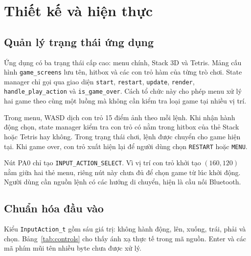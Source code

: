 \chapter{Thiết kế và hiện thực}
\label{chap:implementation}

\section{Quản lý trạng thái ứng dụng}

Ứng dụng có ba trạng thái cấp cao: menu chính, Stack 3D và Tetris. Mảng cấu hình \texttt{game\_screens} lưu tên, hitbox và các con trỏ hàm của từng trò chơi. State manager chỉ gọi qua giao diện \texttt{start}, \texttt{restart}, \texttt{update}, \texttt{render}, \texttt{handle\_play\_action} và \texttt{is\_game\_over}. Cách tổ chức này cho phép menu xử lý hai game theo cùng một luồng mà không cần kiểm tra loại game tại nhiều vị trí.

Trong menu, WASD dịch con trỏ 15 điểm ảnh theo mỗi lệnh. Khi nhận hành động chọn, state manager kiểm tra con trỏ có nằm trong hitbox của thẻ Stack hoặc Tetris hay không. Trong trạng thái chơi, lệnh được chuyển cho game hiện tại. Khi game over, con trỏ xuất hiện lại để người dùng chọn \texttt{RESTART} hoặc \texttt{MENU}.

Nút PA0 chỉ tạo \texttt{INPUT\_ACTION\_SELECT}. Vì vị trí con trỏ khởi tạo $(160,120)$ nằm giữa hai thẻ menu, riêng nút này chưa đủ để chọn game từ lúc khởi động. Người dùng cần nguồn lệnh có các hướng di chuyển, hiện là cầu nối Bluetooth.

\section{Chuẩn hóa đầu vào}

Kiểu \texttt{InputAction\_t} gồm sáu giá trị: không hành động, lên, xuống, trái, phải và chọn. Bảng~\ref{tab:controls} cho thấy ánh xạ thực tế trong mã nguồn. Enter và các mã phím mũi tên nhiều byte chưa được xử lý.

